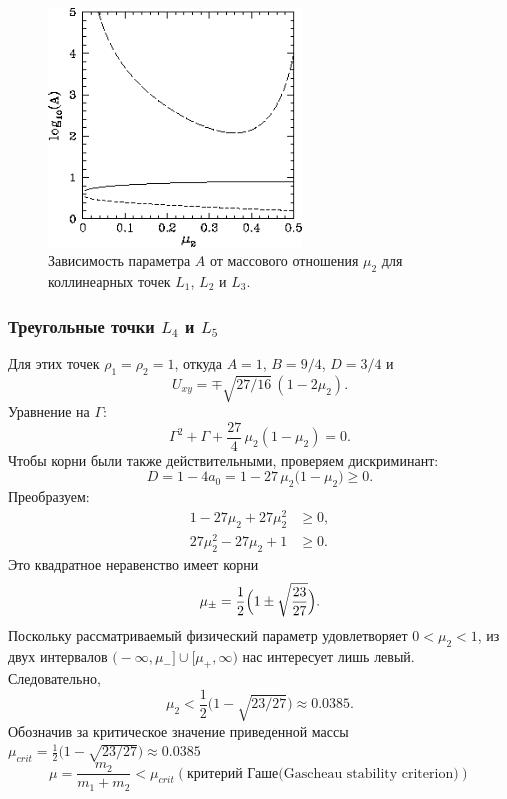 \documentclass[12pt]{article}
\newcommand{\mutwo}{\mu_2}
\begin{document}
\begin{figure}[H]
  \centering
  \includegraphics[width=0.6\textwidth]{image2.png}
  \caption{Зависимость параметра $A$ от массового отношения $\mutwo$ для коллинеарных точек $L_1$, $L_2$ и $L_3$.}
  \label{fig:A_vs_mu}
\end{figure}

\subsubsection{Треугольные точки $L_4$ и $L_5$}
Для этих точек $\rho_1=\rho_2=1$, откуда $A=1$, $B=9/4$, $D=3/4$ и
\[U_{xy}=\mp\sqrt{27/16}\,(1-2\mutwo).\]
Уравнение на $\Gamma$:
\begin{equation}\tag{1116}
  \Gamma^{2}+\Gamma+\frac{27}{4}\,\mutwo(1-\mutwo)=0.
\end{equation}
Чтобы корни были также действительными, проверяем дискриминант:
\begin{equation}
D=1-4a_0=1-27\,\mu_2\bigl(1-\mu_2\bigr)\ge0.
\end{equation}
Преобразуем:
\begin{align}
1-27\mu_2+27\mu_2^2&\ge0,\\[2pt]
27\mu_2^2-27\mu_2+1&\ge0.
\end{align}
Это квадратное неравенство имеет корни
\[\mu_{\pm}=\frac12\Bigl(1\pm\sqrt{\frac{23}{27}}\Bigr).
\]
Поскольку рассматриваемый физический параметр удовлетворяет \(0<\mu_2<1\),
из двух интервалов
\(\bigl(-\infty,\mu_-\bigr]\cup\bigl[\mu_+,\infty\bigr)\)
нас интересует лишь левый.  Следовательно,
\begin{equation}\tag{1117}
  \mutwo<\frac12\bigl(1-\sqrt{23/27}\bigr)\approx0.0385.
\end{equation}
Обозначив за критическое значение приведенной массы $\mu_{crit} = \frac12\bigl(1-\sqrt{23/27}\bigr)\approx0.0385$
\begin{equation}\tag{1118}
  \mu = \frac{m_2}{m_1+m_2}< \mu_{crit} (\text{критерий Гаше(Gascheau stability criterion)})
\end{equation}
\end{document}
